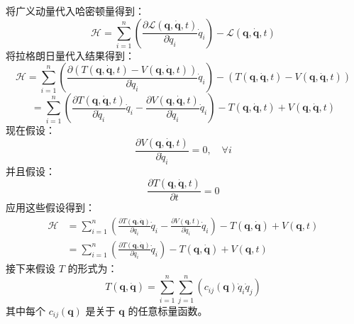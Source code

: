 将广义动量代入哈密顿量得到：
\[
\mathcal{H} = \sum_{i=1}^{n} \left( \frac{\partial \mathcal{L}(\boldsymbol{q}, \boldsymbol{\dot{q}}, t)}{\partial \dot{q}_{i}} \dot{q}_{i} \right) - \mathcal{L}(\boldsymbol{q}, \boldsymbol{\dot{q}}, t)~
\]
将拉格朗日量代入结果得到：
\[
\mathcal{H} = \sum_{i=1}^{n} \left( \frac{\partial \left(T(\boldsymbol{q}, \boldsymbol{\dot{q}}, t) - V(\boldsymbol{q}, \boldsymbol{\dot{q}}, t)\right)}{\partial \dot{q}_{i}} \dot{q}_{i} \right) - \left(T(\boldsymbol{q}, \boldsymbol{\dot{q}}, t) - V(\boldsymbol{q}, \boldsymbol{\dot{q}}, t)\right)~
\]
\[
= \sum_{i=1}^{n} \left( \frac{\partial T(\boldsymbol{q}, \boldsymbol{\dot{q}}, t)}{\partial \dot{q}_{i}} \dot{q}_{i} - \frac{\partial V(\boldsymbol{q}, \boldsymbol{\dot{q}}, t)}{\partial \dot{q}_{i}} \dot{q}_{i} \right) - T(\boldsymbol{q}, \boldsymbol{\dot{q}}, t) + V(\boldsymbol{q}, \boldsymbol{\dot{q}}, t)~
\]
现在假设：
\[
\frac{\partial V(\boldsymbol{q}, \boldsymbol{\dot{q}}, t)}{\partial \dot{q}_{i}} = 0, \quad \forall i~
\]
并且假设：
\[
\frac{\partial T(\boldsymbol{q}, \boldsymbol{\dot{q}}, t)}{\partial t} = 0~
\]
应用这些假设得到：
\begin{equation}
\begin{aligned}
\mathcal{H} &= \sum_{i=1}^{n} \left( \frac{\partial T(\boldsymbol{q}, \boldsymbol{\dot{q}})}{\partial \dot{q}_{i}} \dot{q}_{i} - \frac{\partial V(\boldsymbol{q}, t)}{\partial \dot{q}_{i}} \dot{q}_{i} \right) - T(\boldsymbol{q}, \boldsymbol{\dot{q}}) + V(\boldsymbol{q}, t)\\
&= \sum_{i=1}^{n} \left( \frac{\partial T(\boldsymbol{q}, \boldsymbol{\dot{q}})}{\partial \dot{q}_{i}} \dot{q}_{i} \right) - T(\boldsymbol{q}, \boldsymbol{\dot{q}}) + V(\boldsymbol{q}, t)
\end{aligned}~
\end{equation}
接下来假设 \( T \) 的形式为：
\[
T(\boldsymbol{q}, \boldsymbol{\dot{q}}) = \sum_{i=1}^{n} \sum_{j=1}^{n} \left( c_{ij}(\boldsymbol{q}) \dot{q}_{i} \dot{q}_{j} \right)~
\]
其中每个 \( c_{ij}(\boldsymbol{q}) \) 是关于 \( \boldsymbol{q} \) 的任意标量函数。


